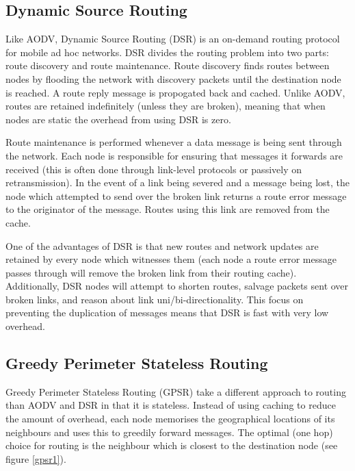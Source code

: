 \subsection{Dynamic Source Routing}
Like AODV, Dynamic Source Routing (DSR) is an on-demand routing protocol for mobile ad hoc networks. DSR divides the routing problem into two parts: route discovery and route maintenance. Route discovery finds routes between nodes by flooding the network with discovery packets until the destination node is reached. A route reply message is propogated back and cached. Unlike AODV, routes are retained indefinitely (unless they are broken), meaning that when nodes are static the overhead from using DSR is zero\cite{Johnson01dsr:the}\cite{johnson2007dynamic}.

Route maintenance is performed whenever a data message is being sent through the network. Each node is responsible for ensuring that messages it forwards are received (this is often done through link-level protocols or passively on retransmission). In the event of a link being severed and a message being lost, the node which attempted to send over the broken link returns a route error message to the originator of the message. Routes using this link are removed from the cache.

One of the advantages of DSR is that new routes and network updates are retained by every node which witnesses them (each node a route error message passes through will remove the broken link from their routing cache). Additionally, DSR nodes will attempt to shorten routes, salvage packets sent over broken links, and reason about link uni/bi-directionality. This focus on preventing the duplication of messages means that DSR is fast with very low overhead.

\subsection{Greedy Perimeter Stateless Routing}
Greedy Perimeter Stateless Routing (GPSR) take a different approach to routing than AODV and DSR in that it is stateless. Instead of using caching to reduce the amount of overhead, each node memorises the geographical locations of its neighbours and uses this to greedily forward messages. The optimal (one hop) choice for routing is the neighbour which is closest to the destination node\cite{karp2000gpsr} (see figure \ref{gpsr1}).


